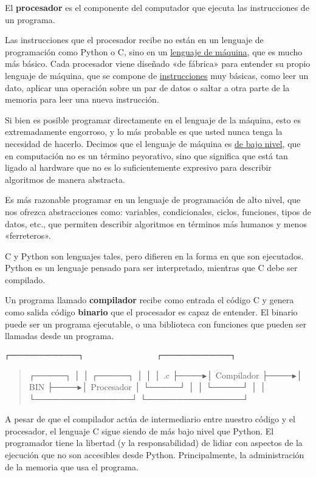 El \textbf{procesador} es el componente del computador que ejecuta las
instrucciones de un programa.

Las instrucciones que el procesador recibe no están en un lenguaje de
programación como Python o C, sino en un
\href{http://en.wikipedia.org/wiki/Machine\_code}{lenguaje de máquina},
que es mucho más básico. Cada procesador viene diseñado «de fábrica»
para entender su propio lenguaje de máquina, que se compone de
\href{http://en.wikipedia.org/wiki/Instruction\_set}{instrucciones} muy
básicas, como leer un dato, aplicar una operación sobre un par de datos
o saltar a otra parte de la memoria para leer una nueva instrucción.

Si bien es posible programar directamente en el lenguaje de la máquina,
esto es extremadamente engorroso, y lo más probable es que usted nunca
tenga la necesidad de hacerlo. Decimos que el lenguaje de máquina es
\href{http://en.wikipedia.org/wiki/Low-level\_programming\_language}{de
bajo nivel}, que en computación no es un término peyorativo, sino que
significa que está tan ligado al hardware que no es lo suficientemente
expresivo para describir algoritmos de manera abstracta.

Es más razonable programar en un lenguaje de programación de alto nivel,
que nos ofrezca abstracciones como: variables, condicionales, ciclos,
funciones, tipos de datos, etc., que permiten describir algoritmos en
términos más humanos y menos «ferreteros».

C y Python son lenguajes tales, pero difieren en la forma en que son
ejecutados. Python es un lenguaje pensado para ser interpretado,
mientras que C debe ser compilado.

Un programa llamado \textbf{compilador} recibe como entrada el código C
y genera como salida código \textbf{binario} que el procesador es capaz
de entender. El binario puede ser un programa ejecutable, o una
biblioteca con funciones que pueden ser llamadas desde un programa.

\begin{lstlisting}
┌────────────────┐                 ┌────────────────┐
\end{lstlisting}

\begin{quote}
┌─────┐ │ │ ┌─────┐ │ │ │ .c ├────▸│ Compilador ├────▸│ BIN ├────▸│
Procesador │ └─────┘ │ │ └─────┘ │ │ └────────────────┘
└────────────────┘
\end{quote}

A pesar de que el compilador actúa de intermediario entre nuestro código
y el procesador, el lenguaje C sigue siendo de más bajo nivel que
Python. El programador tiene la libertad (y la responsabilidad) de
lidiar con aspectos de la ejecución que no son accesibles desde Python.
Principalmente, la administración de la memoria que usa el programa.

